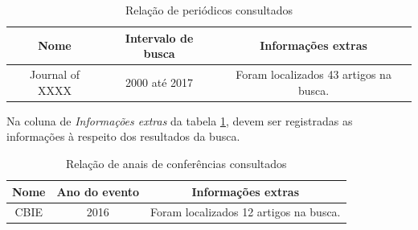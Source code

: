 \documentclass[a4paper,11pt]{article}
\begin{document}
\begin{table}[ht]
\begin{tabular}{|c | c | c |}
\hline
\textbf{Nome} & \textbf{Intervalo de busca} & \textbf{Informações extras} \\
\hline
Journal of XXXX & 2000 até 2017 & Foram localizados 43 artigos na busca. \\
\hline
\end{tabular}
\caption{Relação de periódicos consultados}
\label{tab:tab_periodico}
\end{table}

Na coluna de \emph{Informações extras} da tabela \ref{tab:tab_periodico}, devem ser registradas as informações à respeito dos resultados da busca. 

\begin{table}[ht]
\begin{tabular}{|c | c | c |}
\hline
\textbf{Nome} & \textbf{Ano do evento} & \textbf{Informações extras} \\
\hline
CBIE & 2016 & Foram localizados 12 artigos na busca. \\
\hline
\end{tabular}
\caption{Relação de anais de conferências consultados}
\label{tab:tab_conf}
\end{table}



\end{document}
